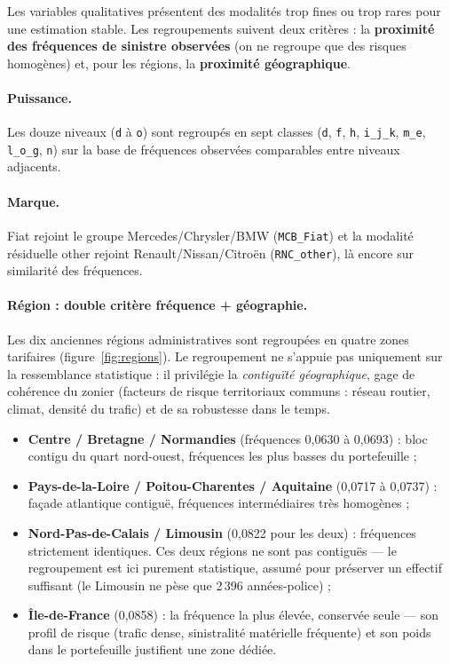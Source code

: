 \documentclass[11pt,a4paper]{article}
\begin{document}
Les variables qualitatives présentent des modalités trop fines ou trop rares pour une estimation stable. Les regroupements suivent deux critères : la \textbf{proximité des fréquences de sinistre observées} (on ne regroupe que des risques homogènes) et, pour les régions, la \textbf{proximité géographique}.

\paragraph{Puissance.} Les douze niveaux (\texttt{d} à \texttt{o}) sont regroupés en sept classes (\texttt{d}, \texttt{f}, \texttt{h}, \texttt{i\_j\_k}, \texttt{m\_e}, \texttt{l\_o\_g}, \texttt{n}) sur la base de fréquences observées comparables entre niveaux adjacents.

\paragraph{Marque.} Fiat rejoint le groupe Mercedes/Chrysler/BMW (\texttt{MCB\_Fiat}) et la modalité résiduelle \og other \fg{} rejoint Renault/Nissan/Citroën (\texttt{RNC\_other}), là encore sur similarité des fréquences.

\paragraph{Région : double critère fréquence + géographie.} Les dix anciennes régions administratives sont regroupées en quatre zones tarifaires (figure~\ref{fig:regions}). Le regroupement ne s'appuie pas uniquement sur la ressemblance statistique : il privilégie la \emph{contiguïté géographique}, gage de cohérence du zonier (facteurs de risque territoriaux communs : réseau routier, climat, densité du trafic) et de sa robustesse dans le temps.

\begin{itemize}
    \item \textbf{Centre / Bretagne / Normandies} (fréquences 0{,}0630 à 0{,}0693) : bloc contigu du quart nord-ouest, fréquences les plus basses du portefeuille ;
    \item \textbf{Pays-de-la-Loire / Poitou-Charentes / Aquitaine} (0{,}0717 à 0{,}0737) : façade atlantique contiguë, fréquences intermédiaires très homogènes ;
    \item \textbf{Nord-Pas-de-Calais / Limousin} (0{,}0822 pour les deux) : fréquences strictement identiques. Ces deux régions ne sont pas contiguës --- le regroupement est ici purement statistique, assumé pour préserver un effectif suffisant (le Limousin ne pèse que 2\,396 années-police) ;
    \item \textbf{Île-de-France} (0{,}0858) : la fréquence la plus élevée, conservée seule --- son profil de risque (trafic dense, sinistralité matérielle fréquente) et son poids dans le portefeuille justifient une zone dédiée.
\end{itemize}
\end{document}

